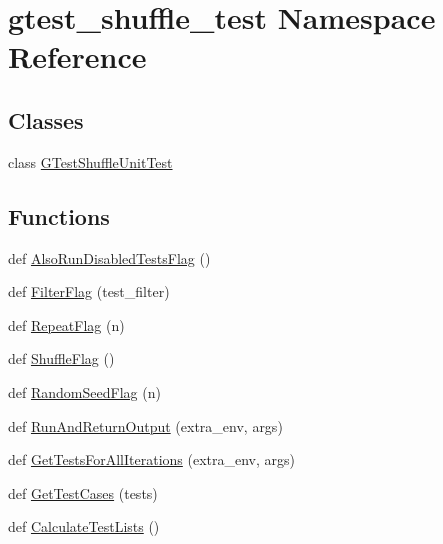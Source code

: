 \hypertarget{namespacegtest__shuffle__test}{}\section{gtest\+\_\+shuffle\+\_\+test Namespace Reference}
\label{namespacegtest__shuffle__test}
\subsection*{Classes}
\begin{DoxyCompactItemize}
\item 
class \hyperlink{classgtest__shuffle__test_1_1GTestShuffleUnitTest}{G\+Test\+Shuffle\+Unit\+Test}
\end{DoxyCompactItemize}
\subsection*{Functions}
\begin{DoxyCompactItemize}
\item 
def \hyperlink{namespacegtest__shuffle__test_a91033ae962b37f040a95fb90062aacb3}{Also\+Run\+Disabled\+Tests\+Flag} ()
\item 
def \hyperlink{namespacegtest__shuffle__test_aa849ecba21a2796be477040bd303b700}{Filter\+Flag} (test\+\_\+filter)
\item 
def \hyperlink{namespacegtest__shuffle__test_a193f6cd2eeb35e7925dca6d8f72f75d3}{Repeat\+Flag} (n)
\item 
def \hyperlink{namespacegtest__shuffle__test_ab593e060bf2a9b2f0cb0dc8e18eb2088}{Shuffle\+Flag} ()
\item 
def \hyperlink{namespacegtest__shuffle__test_aaf2a94c748f266c4267ac7e7bb3451fd}{Random\+Seed\+Flag} (n)
\item 
def \hyperlink{namespacegtest__shuffle__test_afbe879c2b3fdfed12b777b813359dbd4}{Run\+And\+Return\+Output} (extra\+\_\+env, args)
\item 
def \hyperlink{namespacegtest__shuffle__test_a18c7606bf0d41acb73a4a6a2994d36fc}{Get\+Tests\+For\+All\+Iterations} (extra\+\_\+env, args)
\item 
def \hyperlink{namespacegtest__shuffle__test_af5328e9cbee0e357d6abf16255df13f7}{Get\+Test\+Cases} (tests)
\item 
def \hyperlink{namespacegtest__shuffle__test_a51dcc55df3ebd76c676298ef9b4fea19}{Calculate\+Test\+Lists} ()
\end{DoxyCompactItemize}
